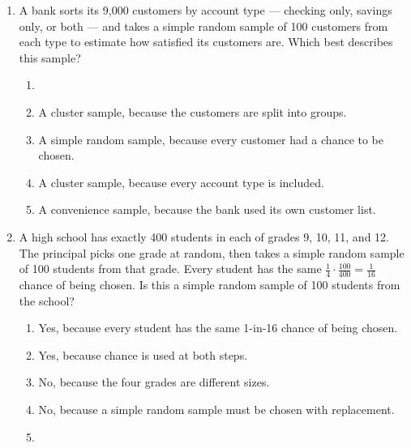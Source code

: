 \documentclass[12pt]{article}
\begin{document}
\begin{enumerate}[leftmargin=1.9em, itemsep=0.13in]
  \boxguard[12]
  \item A bank sorts its 9{,}000 customers by account type --- checking only, savings only, or
        both --- and takes a simple random sample of 100 customers from each type to estimate
        how satisfied its customers are. Which best describes this sample?
        \begin{enumerate}[label=\textbf{(\Alph*)}, leftmargin=2.2em, itemsep=2pt]
          \item {}
          \item A cluster sample, because the customers are split into groups.
          \item A simple random sample, because every customer had a chance to be chosen.
          \item A cluster sample, because every account type is included.
          \item A convenience sample, because the bank used its own customer list.\hfill{}\rule[-0.2in]{0pt}{0.48in}
        \end{enumerate}

  \boxguard[13]
  \item A high school has exactly 400 students in each of grades 9, 10, 11, and 12. The
        principal picks one grade at random, then takes a simple random sample of 100 students
        from that grade. Every student has the same $\tfrac{1}{4}\cdot\tfrac{100}{400} =
        \tfrac{1}{16}$ chance of being chosen. Is this a simple random sample of 100 students
        from the school?
        \begin{enumerate}[label=\textbf{(\Alph*)}, leftmargin=2.2em, itemsep=2pt]
          \item Yes, because every student has the same 1-in-16 chance of being chosen.
          \item Yes, because chance is used at both steps.
          \item No, because the four grades are different sizes.
          \item No, because a simple random sample must be chosen with replacement.
          \item {}\hfill{}\rule[-0.2in]{0pt}{0.48in}
        \end{enumerate}


\end{enumerate}
\end{document}
